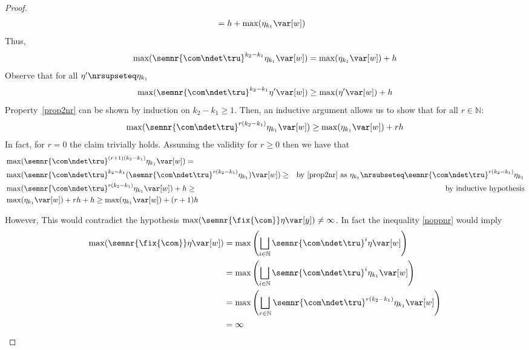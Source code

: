 \begin{proof}
\begin{align*}
                             & = h +  \max(\eta_{k_1} \var[w])  
  \end{align*}
  Thus,
  \[\max(\semnr{\com \ndet \tru}^{k_2-k_1} \eta_{k_1} \var[w]) = \max(\eta_{k_1}
  \var[w]) + h\] 
  Observe that for all \(\eta' \nrsupseteq \eta_{k_1}\)
  \begin{equation}\label{prop2nr}
    \max(\semnr{\com \ndet \tru}^{k_2-k_1} \eta' \var[w]) \geq \max(\eta'
    \var[w]) + h
  \end{equation}
  Property~\eqref{prop2nr} can be shown by induction on \(k_2-k_1 \geq 1\).  
  \noindent    
  Then, an inductive argument allows us to show that for all \(r \in \mathbb{N}\):
  \begin{equation}\label{noppnr}
    \max(\semnr{\com \ndet \tru}^{r(k_2-k_1)} \eta_{k_1} \var[w]) \geq \max(\eta_{k_1}
    \var[w]) + r h
  \end{equation}  
  In fact, for \(r=0\) the claim trivially holds. Assuming the validity for \(r\geq 0\) then we have that
  \begin{align*}    
    & \max(\semnr{\com \ndet \tru}^{(r+1)(k_2-k_1)} \eta_{k_1} \var[w]) =\\
    &\max(\semnr{\com \ndet \tru}^{k_2-k_1} ( \semnr{\com \ndet \tru}^{r(k_2-k_1)} \eta_{k_1}) \var[w]) \geq & \mbox{by \eqref{prop2nr} as }\eta_{k_1} \nrsubseteq \semnr{\com \ndet \tru}^{r(k_2-k_1)} \eta_{k_1}\\
    &\max(\semnr{\com \ndet \tru}^{r(k_2-k_1)} \eta_{k_1} \var[w]) + h \geq & \mbox{by inductive hypothesis}\\
    &  \max(\eta_{k_1}\var[w])  + rh + h
    \geq 
    \max(\eta_{k_1}\var[w])  + (r+1)h
  \end{align*}

  \noindent
  However, This would contradict the hypothesis
  \(\max(\semnr{\fix{\com}} \eta \var[y]) \neq \infty\). In fact the
  inequality \eqref{noppnr} would imply
  \begin{align*}
    \max(\semnr{\fix{\com}} \eta \var[w])
    & = \max\left(\bigsqcup_{i \in \mathbb{N}} \semnr{\com
      \ndet \tru}^i \eta \var[w]\right) \\ 
    & = \max\left(\bigsqcup_{i \in \mathbb{N}} \semnr{\com \ndet
      \tru}^i \eta_{k_1} \var[w]\right)\\ 
    & = \max\left(\bigsqcup_{r \in \mathbb{N}} \semnr{\com \ndet
      \tru}^{r(k_2-k_1)} \eta_{k_1} \var[w]\right)\\
    & = \infty
  \end{align*}



\end{proof}
